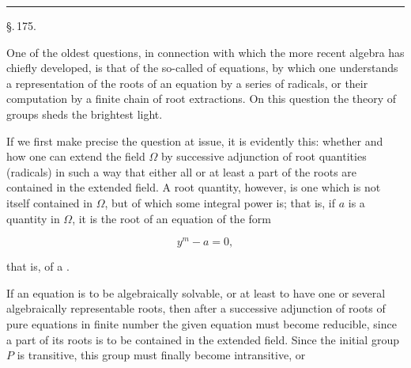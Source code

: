 
\begin{center}


\rule{3cm}{0.4pt}

\S.\,175.

\end{center}

One of the oldest questions, in connection with which the more
recent algebra has chiefly developed, is that of the so-called
 of equations, by which one understands a
representation of the roots of an equation by a series of
radicals, or their computation by a finite chain of root
extractions. On this question the theory of groups sheds the
brightest light.

If we first make precise the question at issue, it is evidently
this: whether and how one can extend the field $\Omega$ by
successive adjunction of root quantities (radicals) in such a way
that either all or at least a part of the roots
are contained in the extended field. A root quantity, however,
is one which is not itself contained in $\Omega$, but of which some
integral power is; that is, if $a$ is a quantity in $\Omega$,
it is the root of an equation of the form

\[
y^m - a = 0,
\]

that is, of a .

If an  equation is to be algebraically solvable,
or at least to have one or several algebraically representable roots,
then after a successive adjunction of roots of
pure equations in finite number the given equation
must become reducible, since a part of its roots is to be contained
in the extended field. Since the initial group $P$ is transitive,
this group must finally become intransitive, or
